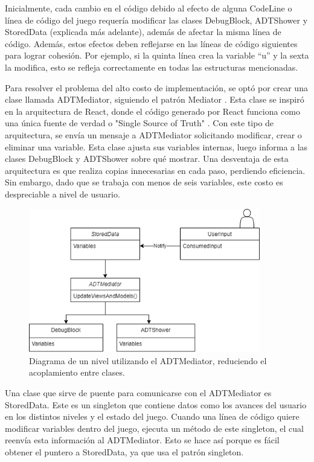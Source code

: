 Inicialmente, cada cambio en el código debido al efecto de alguna CodeLine o línea de código del juego requería modificar las clases DebugBlock, ADTShower y StoredData (explicada más adelante), además de afectar la misma línea de código. Además, estos efectos deben reflejarse en las líneas de código siguientes para lograr cohesión. Por ejemplo, si la quinta línea crea la variable ``u'' y la sexta la modifica, esto se refleja correctamente en todas las estructuras mencionadas.

Para resolver el problema del alto costo de implementación, se optó por crear una clase llamada ADTMediator, siguiendo el patrón Mediator \cite{Freeman2015TheMP}. Esta clase se inspiró en la arquitectura de React, donde el código generado por React funciona como una única fuente de verdad o "Single Source of Truth" \cite{ReactSingleSourceOfTruth}. Con este tipo de arquitectura, se envía un mensaje a ADTMediator solicitando modificar, crear o eliminar una variable. Esta clase ajusta sus variables internas, luego informa a las clases DebugBlock y ADTShower sobre qué mostrar. Una desventaja de esta arquitectura es que realiza copias innecesarias en cada paso, perdiendo eficiencia. Sin embargo, dado que se trabaja con menos de seis variables, este costo es despreciable a nivel de usuario.

\begin{figure}[h!]
	\centering
	\includegraphics[width=0.9\textwidth]{imagenes/ArquitecturaMediatorAfter.png}
	\caption{Diagrama de un nivel utilizando el ADTMediator, reduciendo el acoplamiento entre clases.}
	\label{ArquitecturaMediatorAfter}
\end{figure}

Una clase que sirve de puente para comunicarse con el ADTMediator es StoredData. Este es un singleton que contiene datos como los avances del usuario en los distintos niveles y el estado del juego. Cuando una línea de código quiere modificar variables dentro del juego, ejecuta un método de este singleton, el cual reenvía esta información al ADTMediator. Esto se hace así porque es fácil obtener el puntero a StoredData, ya que usa el patrón singleton.

